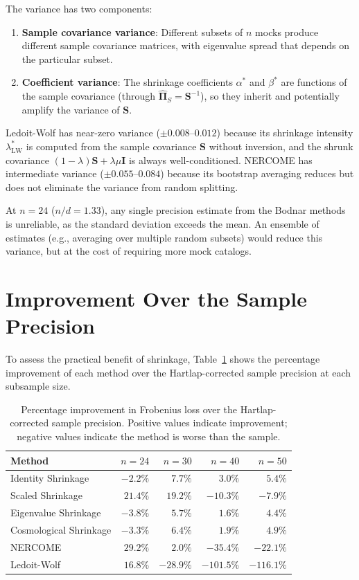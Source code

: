 The variance has two components:
\begin{enumerate}
\item \textbf{Sample covariance variance}: Different subsets of $n$ mocks produce different sample covariance matrices, with eigenvalue spread that depends on the particular subset.
\item \textbf{Coefficient variance}: The shrinkage coefficients $\alpha^*$ and $\beta^*$ are functions of the sample covariance (through $\hat{\boldsymbol{\Pi}}_S = \mathbf{S}^{-1}$), so they inherit and potentially amplify the variance of $\mathbf{S}$.
\end{enumerate}

Ledoit-Wolf has near-zero variance ($\pm 0.008$--$0.012$) because its shrinkage intensity $\lambda^*_{\text{LW}}$ is computed from the sample covariance $\mathbf{S}$ without inversion, and the shrunk covariance $(1 - \lambda)\mathbf{S} + \lambda\mu\mathbf{I}$ is always well-conditioned. NERCOME has intermediate variance ($\pm 0.055$--$0.084$) because its bootstrap averaging reduces but does not eliminate the variance from random splitting.

At $n = 24$ ($n/d = 1.33$), any single precision estimate from the Bodnar methods is unreliable, as the standard deviation exceeds the mean. An ensemble of estimates (e.g., averaging over multiple random subsets) would reduce this variance, but at the cost of requiring more mock catalogs.

\section{Improvement Over the Sample Precision}

To assess the practical benefit of shrinkage, Table~\ref{tab:app_improvement} shows the percentage improvement of each method over the Hartlap-corrected sample precision at each subsample size.

\begin{table}[htbp]
\centering
\caption{Percentage improvement in Frobenius loss over the Hartlap-corrected sample precision. Positive values indicate improvement; negative values indicate the method is worse than the sample.}
\label{tab:app_improvement}
\begin{tabular}{@{}lrrrr@{}}
\toprule
Method & $n = 24$ & $n = 30$ & $n = 40$ & $n = 50$ \\
\midrule
Identity Shrinkage       & $-2.2\%$ & $7.7\%$  & $3.0\%$  & $5.4\%$ \\
Scaled Shrinkage         & $21.4\%$ & $19.2\%$ & $-10.3\%$ & $-7.9\%$ \\
Eigenvalue Shrinkage     & $-3.8\%$ & $5.7\%$  & $1.6\%$  & $4.4\%$ \\
Cosmological Shrinkage   & $-3.3\%$ & $6.4\%$  & $1.9\%$  & $4.9\%$ \\
NERCOME                  & $29.2\%$ & $2.0\%$  & $-35.4\%$ & $-22.1\%$ \\
Ledoit-Wolf              & $16.8\%$ & $-28.9\%$ & $-101.5\%$ & $-116.1\%$ \\
\bottomrule
\end{tabular}
\end{table}

